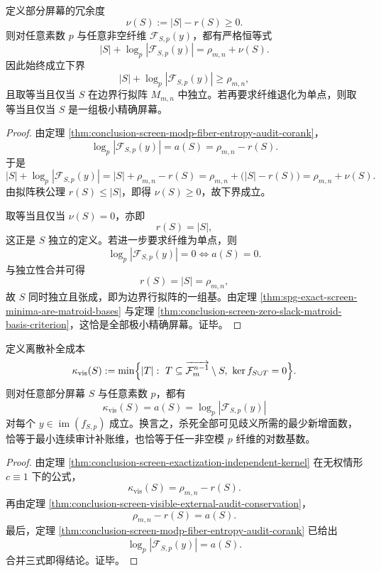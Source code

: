 \begin{theorem}\label{thm:conclusion-screen-visible-hidden-padic-entropy-conservation}
定义部分屏幕的冗余度
\[
\nu(S):=|S|-r(S)\ge 0.
\]
则对任意素数 \(p\) 与任意非空纤维 \(\mathcal F_{S,p}(y)\)，都有严格恒等式
\[
|S|+\log_p |\mathcal F_{S,p}(y)|
=
\rho_{m,n}+\nu(S).
\]
因此始终成立下界
\[
|S|+\log_p |\mathcal F_{S,p}(y)|\ge \rho_{m,n},
\]
且取等当且仅当 \(S\) 在边界行拟阵 \(M_{m,n}\) 中独立。若再要求纤维退化为单点，则取等当且仅当 \(S\) 是一组极小精确屏幕。
\end{theorem}
\begin{proof}
由定理 \ref{thm:conclusion-screen-modp-fiber-entropy-audit-corank}，
\[
\log_p |\mathcal F_{S,p}(y)|=a(S)=\rho_{m,n}-r(S).
\]
于是
\[
|S|+\log_p |\mathcal F_{S,p}(y)|
=
|S|+\rho_{m,n}-r(S)
=
\rho_{m,n}+\bigl(|S|-r(S)\bigr)
=
\rho_{m,n}+\nu(S).
\]
由拟阵秩公理 \(r(S)\le |S|\)，即得 \(\nu(S)\ge 0\)，故下界成立。

取等当且仅当 \(\nu(S)=0\)，亦即
\[
r(S)=|S|,
\]
这正是 \(S\) 独立的定义。若进一步要求纤维为单点，则
\[
\log_p |\mathcal F_{S,p}(y)|=0
\iff
a(S)=0.
\]
与独立性合并可得
\[
r(S)=|S|=\rho_{m,n},
\]
故 \(S\) 同时独立且张成，即为边界行拟阵的一组基。由定理 \ref{thm:spg-exact-screen-minima-are-matroid-bases} 与定理 \ref{thm:conclusion-screen-zero-slack-matroid-basis-criterion}，这恰是全部极小精确屏幕。证毕。
\end{proof}

\begin{theorem}\label{thm:conclusion-screen-discrete-continuous-completion-entropy-identification}
定义离散补全成本
\[
\kappa_{\mathrm{vis}}(S)
:=
\min\Bigl\{
|T|:\ 
T\subseteq \overrightarrow{\mathcal F_m^{n-1}}\setminus S,\
\ker f_{S\cup T}=0
\Bigr\}.
\]
则对任意部分屏幕 \(S\) 与任意素数 \(p\)，都有
\[
\kappa_{\mathrm{vis}}(S)=a(S)=\log_p |\mathcal F_{S,p}(y)|
\]
对每个 \(y\in \operatorname{im}(f_{S,p})\) 成立。换言之，杀死全部可见歧义所需的最少新增面数，恰等于最小连续审计补账维，也恰等于任一非空模 \(p\) 纤维的对数基数。
\end{theorem}
\begin{proof}
由定理 \ref{thm:conclusion-screen-exactization-independent-kernel} 在无权情形 \(c\equiv 1\) 下的公式，
\[
\kappa_{\mathrm{vis}}(S)=\rho_{m,n}-r(S).
\]
再由定理 \ref{thm:conclusion-screen-visible-external-audit-conservation}，
\[
\rho_{m,n}-r(S)=a(S).
\]
最后，定理 \ref{thm:conclusion-screen-modp-fiber-entropy-audit-corank} 已给出
\[
\log_p |\mathcal F_{S,p}(y)|=a(S).
\]
合并三式即得结论。证毕。
\end{proof}

